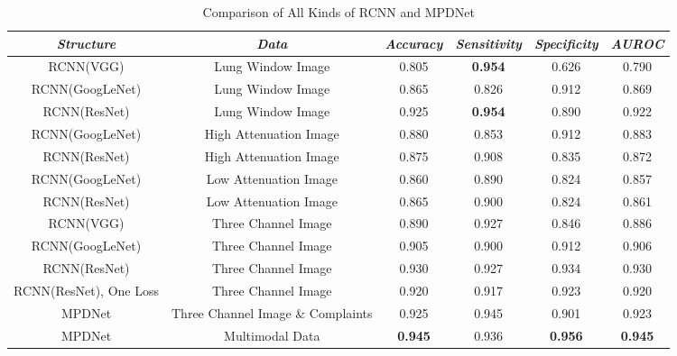 \begin{table}[htb]
    \caption{Comparison of All Kinds of RCNN and MPDNet}
    \begin{center}
    \begin{tabular}{|c|c|c|c|c|c|}

    \hline
    \textbf{\textit{Structure}} & \textbf{\textit{Data}}& \textbf{\textit{Accuracy}}  & \textbf{\textit{Sensitivity}} & \textbf{\textit{Specificity}} & \textbf{\textit{AUROC}}\\
    \hline
    RCNN(VGG) & Lung Window Image & 0.805 & {\bfseries 0.954} &0.626 &0.790 \\
    RCNN(GoogLeNet) & Lung Window Image& 0.865 & 0.826 & 0.912 & 0.869 \\
    RCNN(ResNet) & Lung Window Image & 0.925 & {\bfseries 0.954} & 0.890 & 0.922 \\
    RCNN(GoogLeNet) & High Attenuation Image& 0.880 & 0.853 & 0.912 & 0.883 \\
    RCNN(ResNet)& High Attenuation Image& 0.875 & 0.908 & 0.835 & 0.872 \\
    RCNN(GoogLeNet) & Low Attenuation Image& 0.860 & 0.890 & 0.824 & 0.857 \\
    RCNN(ResNet) & Low Attenuation Image& 0.865 & 0.900 & 0.824 & 0.861 \\
    RCNN(VGG) & Three Channel Image& 0.890 & 0.927 &0.846 &0.886 \\
    RCNN(GoogLeNet)& Three Channel Image & 0.905 & 0.900 & 0.912 & 0.906 \\
    RCNN(ResNet) & Three Channel Image&  0.930 & 0.927 &  0.934 &  0.930 \\
    RCNN(ResNet), One Loss & Three Channel Image& 0.920 & 0.917 & 0.923 & 0.920 \\
    \hline
    MPDNet & Three Channel Image \& Complaints & 0.925 & 0.945 & 0.901 & 0.923 \\
    MPDNet & Multimodal Data&  {\bfseries 0.945} & 0.936 & {\bfseries 0.956} & {\bfseries 0.945} \\
    \hline

    \end{tabular}
    \vspace{-0cm}
    \label{rcnncompare}
    \end{center}
    \vspace{-0cm}
    \end{table}

